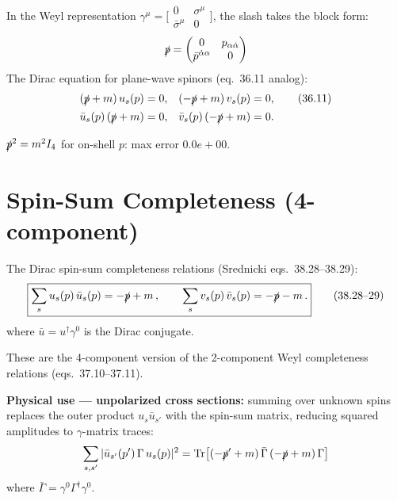 \documentclass[12pt]{article}
\newcommand{\verified}[1]{\textcolor{verifygreen}{\checkmark\; #1}}
\begin{document}
In the Weyl representation $\gamma^\mu = \bigl[\begin{smallmatrix}0&\sigma^\mu\\\bar\sigma^\mu&0\end{smallmatrix}\bigr]$,
the slash takes the block form:
\begin{equation}
  \slashed{p} = \begin{pmatrix}0 & p_{\alpha\dot\alpha} \\ \bar p^{\dot\alpha\alpha} & 0\end{pmatrix}
\end{equation}
The Dirac equation for plane-wave spinors (eq.~36.11 analog):
\begin{align}
  (\slashed{p} + m)\,u_s(p) &= 0, & (-\slashed{p}+m)\,v_s(p) &= 0, \tag{36.11}\\
  \bar u_s(p)\,(\slashed{p}+m) &= 0, & \bar v_s(p)\,(-\slashed{p}+m) &= 0.
\end{align}

\verified{$\slashed{p}^2 = m^2 I_4$ for on-shell $p$: max error $0.0e+00$.}

\section{Spin-Sum Completeness (4-component)}

The Dirac spin-sum completeness relations (Srednicki eqs.~38.28--38.29):
\begin{equation}
  \boxed{
    \sum_s u_s(p)\,\bar u_s(p) = -\slashed{p} + m\,,
    \qquad
    \sum_s v_s(p)\,\bar v_s(p) = -\slashed{p} - m\,.
  }
  \tag{38.28--29}
\end{equation}
where $\bar u = u^\dagger\gamma^0$ is the Dirac conjugate.

These are the 4-component version of the 2-component Weyl completeness relations
(eqs.~37.10--37.11).

\textbf{Physical use --- unpolarized cross sections:}  summing over unknown spins
replaces the outer product $u_s\bar u_{s'}$ with the spin-sum matrix, reducing
squared amplitudes to $\gamma$-matrix traces:
\begin{equation}
  \sum_{s,s'}|\bar u_{s'}(p')\,\Gamma\,u_s(p)|^2
  = \mathrm{Tr}\bigl[(-\slashed{p}'+m)\,\bar\Gamma\,(-\slashed{p}+m)\,\Gamma\bigr]
\end{equation}
where $\bar\Gamma = \gamma^0\Gamma^\dagger\gamma^0$.
\end{document}
